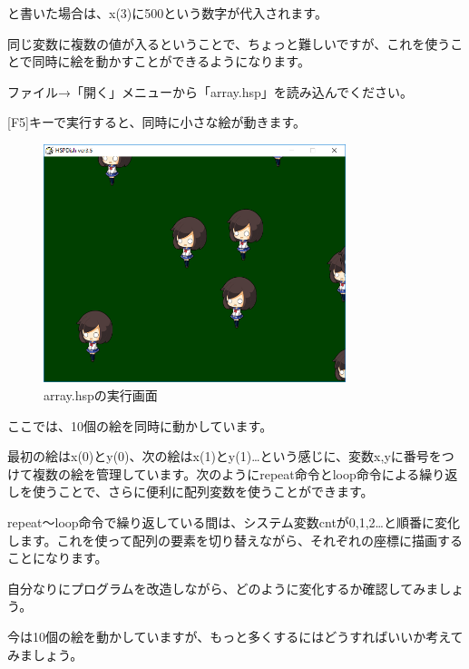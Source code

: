 \begin{description}
    \item {}
    \item {}
\end{description}

と書いた場合は、x(3)に500という数字が代入されます。

同じ変数に複数の値が入るということで、ちょっと難しいですが、これを使うことで同時に絵を動かすことができるようになります。

ファイル→「開く」メニューから「array.hsp」を読み込んでください。

[F5]キーで実行すると、同時に小さな絵が動きます。

\begin{figure}[H]
    \begin{center}
      \includegraphics[keepaspectratio,width=8.811cm,height=6.946cm]{text04-img/text04-img036.png}
      \caption{array.hspの実行画面}
    \end{center}
    \label{fig:prog_menu}
\end{figure}

ここでは、10個の絵を同時に動かしています。

最初の絵はx(0)とy(0)、次の絵はx(1)とy(1)…という感じに、変数x,yに番号をつけて複数の絵を管理しています。次のようにrepeat命令とloop命令による繰り返しを使うことで、さらに便利に配列変数を使うことができます。


\begin{description}
    \item {}
    \item {}
    \item {}
    \item {}
\end{description}

repeat〜loop命令で繰り返している間は、システム変数cntが0,1,2…と順番に変化します。これを使って配列の要素を切り替えながら、それぞれの座標に描画することになります。

自分なりにプログラムを改造しながら、どのように変化するか確認してみましょう。

今は10個の絵を動かしていますが、もっと多くするにはどうすればいいか考えてみましょう。




